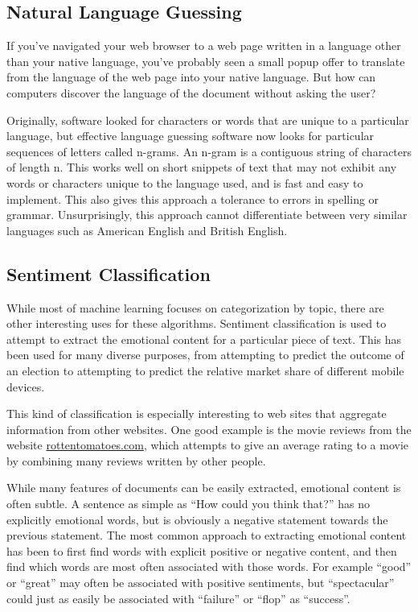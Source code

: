 \documentclass[12pt]{article}
\begin{document}
\subsection{Natural Language Guessing}
If you've navigated your web browser to a web page written in a language other than your native language,
you've probably seen a small popup offer to translate from the language of the web page into your native
language. But how can computers discover the language of the document without asking the user?

Originally, software looked for characters or words that are unique to a particular language, but effective
language guessing software now looks for particular sequences of letters called n-grams. An n-gram is a
contiguous string of characters of length n. This works well on short snippets of text that may not exhibit
any words or characters unique to the language used, and is fast and easy to implement. This also gives this
approach a tolerance to errors in spelling or grammar. Unsurprisingly, this approach cannot differentiate
between very similar languages such as American English and British English. \cite{martins2005language}
\subsection{Sentiment Classification}
While most of machine learning focuses on categorization by topic, there are other interesting uses for these
algorithms.  Sentiment classification is used to attempt to extract the emotional content for a particular
piece of text. This has been used for many diverse purposes, from attempting to predict the outcome of an
election to attempting to predict the relative market share of different mobile devices.

This kind of classification is especially interesting to web sites that aggregate information from other
websites. One good example is the movie reviews from the website \url{rottentomatoes.com}, which attempts to
give an average rating to a movie by combining many reviews written by other people. \cite{pang2002thumbs}

While many features of documents can be easily extracted, emotional content is often subtle. A sentence as
simple as ``How could you think that?'' has no explicitly emotional words, but is obviously a negative
statement towards the previous statement. The most common approach to extracting emotional content has been to
first find words with explicit positive or negative content, and then find which words are most often
associated with those words. For example ``good'' or ``great'' may often be associated with positive
sentiments, but ``spectacular'' could just as easily be associated with ``failure'' or ``flop'' as
``success''.
\end{document}
